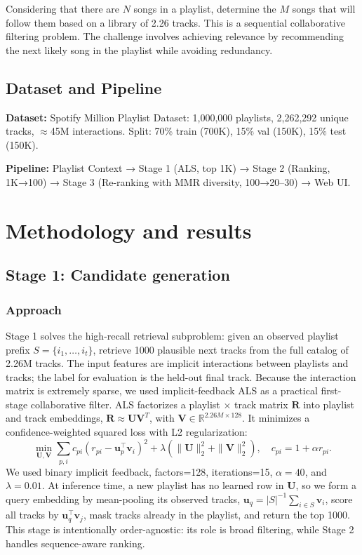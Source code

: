 \documentclass[11pt,a4paper]{article}
\begin{document}
Considering that there are $N$ songs in a playlist, determine the $M$ songs that will follow them based on a library of 2.26 tracks. This is a sequential collaborative filtering problem. The challenge involves achieving relevance by recommending the next likely song in the playlist while avoiding redundancy.

\subsection{Dataset and Pipeline}

\textbf{Dataset:} Spotify Million Playlist Dataset: 1,000,000 playlists, 2,262,292 unique tracks, $\approx$45M interactions. Split: 70\% train (700K), 15\% val (150K), 15\% test (150K).

\textbf{Pipeline:} Playlist Context → Stage 1 (ALS, top 1K) → Stage 2 (Ranking, 1K→100) → Stage 3 (Re-ranking with MMR diversity, 100→20--30) → Web UI.



\section{Methodology and results}

\subsection{Stage 1: Candidate generation}

\subsubsection{Approach}

Stage 1 solves the high-recall retrieval subproblem: given an observed playlist prefix
$S=\{i_1,\ldots,i_t\}$, retrieve 1000 plausible next tracks from the full catalog of
2.26M tracks. The input features are implicit interactions between playlists and tracks;
the label for evaluation is the held-out final track. Because the interaction matrix is
extremely sparse, we used implicit-feedback ALS as a practical first-stage collaborative
filter. ALS factorizes a playlist $\times$ track matrix $\mathbf{R}$ into playlist and track
embeddings, $\mathbf{R}\approx \mathbf{U}\mathbf{V}^T$, with
$\mathbf{V}\in\mathbb{R}^{2.26M\times128}$. It minimizes a confidence-weighted squared
loss with L2 regularization:
\[
\min_{\mathbf{U},\mathbf{V}}
\sum_{p,i} c_{pi}(r_{pi}-\mathbf{u}_p^\top\mathbf{v}_i)^2
+ \lambda(\|\mathbf{U}\|_2^2+\|\mathbf{V}\|_2^2),
\quad c_{pi}=1+\alpha r_{pi}.
\]
We used binary implicit feedback, factors=128, iterations=15, $\alpha=40$, and
$\lambda=0.01$. At inference time, a new playlist has no learned row in $\mathbf{U}$, so
we form a query embedding by mean-pooling its observed tracks,
$\mathbf{u}_q = |S|^{-1}\sum_{i\in S}\mathbf{v}_i$, score all tracks by
$\mathbf{u}_q^\top\mathbf{v}_j$, mask tracks already in the playlist, and return the top
1000. This stage is intentionally order-agnostic: its role is broad filtering, while Stage
2 handles sequence-aware ranking.
\end{document}
